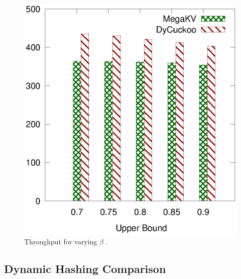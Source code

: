 \begin{figure}[htp]
\begin{minipage}{0.19\linewidth}
		\centerline{\dsali}
	\end{minipage}
	\begin{minipage}{0.19\linewidth}\centering
		\includegraphics[width=\linewidth]{pic/dynamic/upper/dynamic_random.eps}
		\centerline{\dsrandom}
	\end{minipage}
	\caption{Throughput for varying $\beta$ .}
	\label{fig:vary-upper-time}
\end{figure}

\subsection{Dynamic Hashing Comparison}\label{sec:exp:dynamic}

